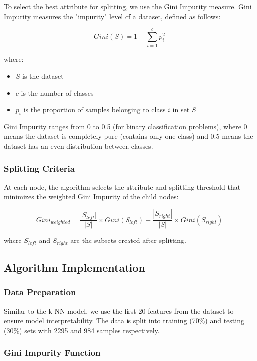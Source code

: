 To select the best attribute for splitting, we use the Gini Impurity measure. Gini Impurity measures the "impurity" level of a dataset, defined as follows:

\begin{equation}
Gini(S) = 1 - \sum_{i=1}^{c} p_i^2
\end{equation}

where:
\begin{itemize}
    \item $S$ is the dataset
    \item $c$ is the number of classes
    \item $p_i$ is the proportion of samples belonging to class $i$ in set $S$
\end{itemize}

Gini Impurity ranges from 0 to 0.5 (for binary classification problems), where 0 means the dataset is completely pure (contains only one class) and 0.5 means the dataset has an even distribution between classes.

\subsubsection{Splitting Criteria}

At each node, the algorithm selects the attribute and splitting threshold that minimizes the weighted Gini Impurity of the child nodes:

\begin{equation}
Gini_{weighted} = \frac{|S_{left}|}{|S|} \times Gini(S_{left}) + \frac{|S_{right}|}{|S|} \times Gini(S_{right})
\end{equation}

where $S_{left}$ and $S_{right}$ are the subsets created after splitting.

\subsection{Algorithm Implementation}

\subsubsection{Data Preparation}

Similar to the k-NN model, we use the first 20 features from the dataset to ensure model interpretability. The data is split into training (70\%) and testing (30\%) sets with 2295 and 984 samples respectively.

\subsubsection{Gini Impurity Function}

